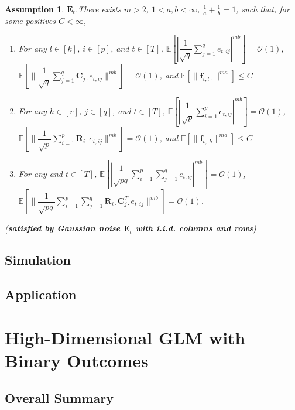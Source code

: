 \documentclass{article}[12pt]
\newtheorem{assumption}{Assumption}
\begin{document}
\begin{assumption}\label{assumption 5 1.7.1}
     $\mathbf{E}_t$.\normalfont  There exists $m>2$, $1<a,b<\infty$, $\frac{1}{a}+\frac{1}{b} = 1$, such that, for some positives $C<\infty$,
    \begin{enumerate}
        \item For any $l \in \left[k\right]$, $i \in \left[p\right]$, and $t \in \left[T\right]$, $\mathbb{E}\left[|\dfrac{1}{\sqrt{q}}\sum_{j=1}^{q}e_{t,ij}|^{mb}\right] = \mathcal{O}(1)$, $\mathbb{E}\left[\lVert\dfrac{1}{\sqrt{q}}\sum_{j=1}^{q}\mathbf{C}_{j\cdot}e_{t,ij}\rVert^{mb}\right] = \mathcal{O}(1)$, and $\mathbb{E}\left[\lVert\mathbf{f}_{t,l\cdot}\rVert^{ma}\right] \leq C$
        \item For any $h \in \left[r\right]$, $j \in \left[q\right]$, and $t \in \left[T\right]$, $\mathbb{E}\left[|\dfrac{1}{\sqrt{p}}\sum_{i=1}^{p}e_{t,ij}|^{mb}\right] = \mathcal{O}(1)$, $\mathbb{E}\left[\lVert\dfrac{1}{\sqrt{p}}\sum_{i=1}^{p}\mathbf{R}_{i\cdot}e_{t,ij}\rVert^{mb}\right] = \mathcal{O}(1)$, and $\mathbb{E}\left[\lVert\mathbf{f}_{t,\cdot h}\rVert^{ma}\right] \leq C$
        \item For any and $t \in \left[T\right]$, $\mathbb{E}\left[|\dfrac{1}{\sqrt{pq}}\sum_{i=1}^{p}\sum_{j=1}^qe_{t,ij}|^{mb}\right] = \mathcal{O}(1)$, $\mathbb{E}\left[\lVert\dfrac{1}{\sqrt{pq}}\sum_{i=1}^{p}\sum_{j=1}^q\mathbf{R}_{i\cdot}\mathbf{C}_{j\cdot}^Te_{t,ij}\rVert^{mb}\right] = \mathcal{O}(1)$.
        
    \end{enumerate}
    
    (\textbf{\textit{satisfied by Gaussian noise $\mathbf{E}_t$ with i.i.d. columns and rows}})
\end{assumption}


 

\subsection{Simulation}

\subsection{Application}
\section{High-Dimensional GLM with Binary Outcomes}
\subsection{Overall Summary}
\end{document}
